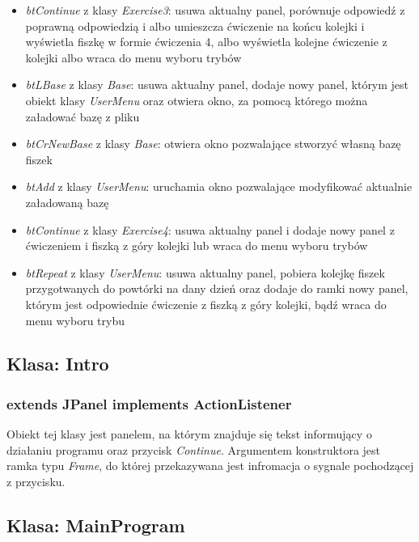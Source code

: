 \documentclass[11pt]{article}
\begin{document}
\begin{itemize}
	\item \textit{btContinue} z klasy \textit{Exercise3}: usuwa aktualny panel, porównuje odpowiedź z poprawną odpowiedzią i albo umieszcza ćwiczenie na końcu kolejki i wyświetla fiszkę w formie ćwiczenia 4, albo wyświetla kolejne ćwiczenie z kolejki albo wraca do menu wyboru trybów
	
	\item \textit{btLBase} z klasy \textit{Base}: usuwa aktualny panel, dodaje nowy panel, którym jest obiekt klasy \textit{UserMenu} oraz otwiera okno, za pomocą którego można załadować bazę z pliku
	
	\item \textit{btCrNewBase} z klasy \textit{Base}: otwiera okno pozwalające stworzyć własną bazę fiszek
	
	\item \textit{btAdd} z klasy \textit{UserMenu}: uruchamia okno pozwalające modyfikować aktualnie załadowaną bazę
	
	\item \textit{btContinue} z klasy \textit{Exercise4}: usuwa aktualny panel i dodaje nowy panel z ćwiczeniem i fiszką z góry kolejki lub wraca do menu wyboru trybów
	
	\item \textit{btRepeat} z klasy \textit{UserMenu}: usuwa aktualny panel, pobiera kolejkę fiszek przygotwanych do powtórki na dany dzień oraz dodaje do ramki nowy panel, którym jest odpowiednie ćwiczenie z fiszką z góry kolejki, bądź wraca do menu wyboru trybu
	
\end{itemize}

\subsection{Klasa: Intro}
\subsubsection*{extends JPanel implements ActionListener}

Obiekt tej klasy jest panelem, na którym znajduje się tekst informujący o działaniu programu oraz przycisk \textit{Continue}. Argumentem konstruktora jest ramka typu \textit{Frame}, do której przekazywana jest infromacja o sygnale pochodzącej z przycisku.

\subsection{Klasa: MainProgram}
\end{document}
